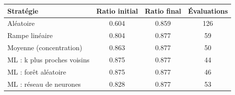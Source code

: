 \begin{tabular}{lccc}
\toprule
Stratégie & Ratio initial & Ratio final & Évaluations \\
\midrule
Aléatoire & 0.604 & 0.859 & 126 \\
Rampe linéaire & 0.804 & 0.877 & 59 \\
Moyenne (concentration) & 0.863 & 0.877 & 50 \\
ML : k plus proches voisins & 0.875 & 0.877 & 44 \\
ML : forêt aléatoire & 0.875 & 0.877 & 46 \\
ML : réseau de neurones & 0.828 & 0.877 & 53 \\
\bottomrule
\end{tabular}